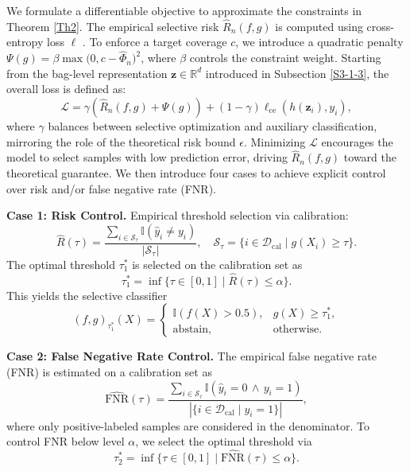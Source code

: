 \documentclass[journal,twoside,web]{ieeecolor}
\begin{document}
We formulate a differentiable objective to approximate the constraints in Theorem \ref{Th2}. The empirical selective risk $\hat{R}_n(f,g)$ is computed using cross-entropy loss $\ell$ \cite{geifman2019selectivenet}. To enforce a target coverage $c$, we introduce a quadratic penalty $\Psi(g) = \beta \max\big(0, c - \hat{\Phi}_n \big)^2$, where $\beta$ controls the constraint weight. Starting from the bag-level representation $\mathbf{z} \in \mathbb{R}^d$ introduced in Subsection \ref{S3-1-3}, the overall loss is defined as:
\begin{equation*}
    \mathcal{L} = \gamma \left(\hat{R}_n(f,g) + \Psi(g)\right) + (1-\gamma) \ell_{\mathrm{ce}}(h(\mathbf{z}_i), y_i),
\end{equation*}
where $\gamma$ balances between selective optimization and auxiliary classification, mirroring the role of the theoretical risk bound $\epsilon$. Minimizing $\mathcal{L}$ encourages the model to select samples with low prediction error, driving $\hat{R}_n(f,g)$ toward the theoretical guarantee. We then introduce four cases to achieve explicit control over risk and/or false negative rate (FNR).

\textbf{Case 1: Risk Control.}
Empirical threshold selection via calibration:
\[
\hat{R}(\tau)=\frac{\sum_{i\in\mathcal{S}_\tau}\mathbb{I}(\hat{y}_i \neq y_i)}{|\mathcal{S}_\tau|},
\quad
\mathcal{S}_\tau=\{i\in\mathcal{D}_{\mathrm{cal}}\mid g(X_i)\geq \tau\}.
\]
The optimal threshold $\tau_{1}^*$ is selected on the calibration set as
\begin{equation}\label{Eq1}
    \tau_{1}^*=\inf\{\tau \in[0,1]\mid\hat{R}(\tau)\leq\alpha\}.
\end{equation}
This yields the selective classifier
\[
(f,g)_{\tau_{1}^*}(X)=
\begin{cases}
\mathbb{I}\!\left(f(X)>0.5\right), & g(X)\geq \tau_{1}^*,\\[4pt]
\text{abstain}, & \text{otherwise}.
\end{cases}
\]

\textbf{Case 2: False Negative Rate Control.}
The empirical false negative rate (FNR) is estimated on a calibration set as
\[
\widehat{\mathrm{FNR}}(\tau)=\frac{\sum_{i \in\mathcal{S}_\tau}\mathbb{I}(\hat{y}_i=0\,\wedge\, y_i=1)}{|\{i\in\mathcal{D}_{\mathrm{cal}}\mid y_i=1\}|},
\]
where only positive-labeled samples are considered in the denominator. To control FNR below level $\alpha$, we select the optimal threshold via 
\begin{equation}\label{Eq2}
  \tau_{2}^*=\inf\{\tau\in[0,1]\mid \widehat{\mathrm{FNR}}(\tau)\leq\alpha\}.  
\end{equation}
\end{document}
